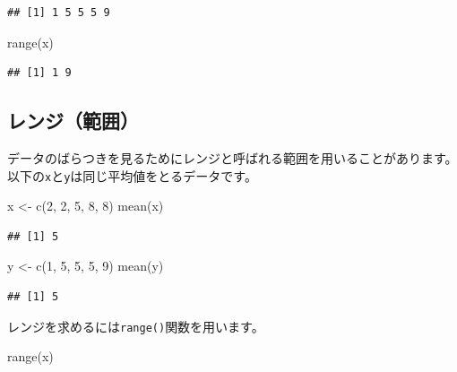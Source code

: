 \documentclass[
  12pt,
]{book}
\newenvironment{Shaded}{\begin{snugshade}}{\end{snugshade}}
\newcommand{\DecValTok}[1]{\textcolor[rgb]{0.00,0.00,0.81}{#1}}
\newcommand{\FunctionTok}[1]{\textcolor[rgb]{0.00,0.00,0.00}{#1}}
\newcommand{\NormalTok}[1]{#1}
\newcommand{\OtherTok}[1]{\textcolor[rgb]{0.56,0.35,0.01}{#1}}
\begin{document}
\begin{verbatim}
## [1] 1 5 5 5 9
\end{verbatim}

\begin{Shaded}
\begin{Highlighting}[]
\FunctionTok{range}\NormalTok{(x)}
\end{Highlighting}
\end{Shaded}

\begin{verbatim}
## [1] 1 9
\end{verbatim}

\hypertarget{ux30ecux30f3ux30b8ux7bc4ux56f2}{%
\subsection{レンジ（範囲）}\label{ux30ecux30f3ux30b8ux7bc4ux56f2}}

データのばらつきを見るためにレンジと呼ばれる範囲を用いることがあります。以下の\texttt{x}と\texttt{y}は同じ平均値をとるデータです。

\begin{Shaded}
\begin{Highlighting}[]
\NormalTok{x }\OtherTok{\textless{}{-}} \FunctionTok{c}\NormalTok{(}\DecValTok{2}\NormalTok{, }\DecValTok{2}\NormalTok{, }\DecValTok{5}\NormalTok{, }\DecValTok{8}\NormalTok{, }\DecValTok{8}\NormalTok{)}
\FunctionTok{mean}\NormalTok{(x)}
\end{Highlighting}
\end{Shaded}

\begin{verbatim}
## [1] 5
\end{verbatim}

\begin{Shaded}
\begin{Highlighting}[]
\NormalTok{y }\OtherTok{\textless{}{-}} \FunctionTok{c}\NormalTok{(}\DecValTok{1}\NormalTok{, }\DecValTok{5}\NormalTok{, }\DecValTok{5}\NormalTok{, }\DecValTok{5}\NormalTok{, }\DecValTok{9}\NormalTok{)}
\FunctionTok{mean}\NormalTok{(y)}
\end{Highlighting}
\end{Shaded}

\begin{verbatim}
## [1] 5
\end{verbatim}

レンジを求めるには\texttt{range()}関数を用います。

\begin{Shaded}
\begin{Highlighting}[]
\FunctionTok{range}\NormalTok{(x)}
\end{Highlighting}
\end{Shaded}
\end{document}
